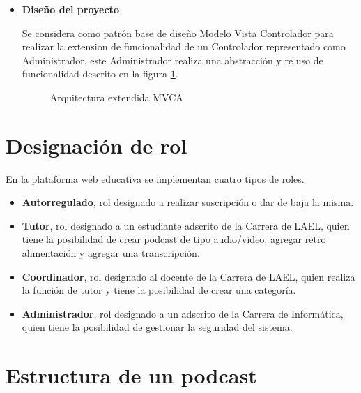 \begin{itemize}

\item \textbf{Diseño del proyecto}

Se considera como patrón base de diseño Modelo Vista Controlador para realizar
la extension de funcionalidad de un Controlador representado como Administrador,
este Administrador realiza una abstracción y re uso de funcionalidad descrito
en la figura \ref{fig:Arquitectura extendida MVCA}.

\begin{figure}[ht]
	\centering
	\caption{Arquitectura extendida MVCA}
	\label{fig:Arquitectura extendida MVCA}
\end{figure}


\end{itemize}

\section{Designación de rol}

En la plataforma web educativa se implementan cuatro tipos de roles.

\begin{itemize}

\item \textbf{Autorregulado}, rol designado a realizar suscripción o dar de
baja la misma.

\item \textbf{Tutor}, rol designado a un estudiante adscrito de la Carrera de
LAEL, quien tiene la posibilidad de crear podcast de tipo audio/vídeo, agregar
retro alimentación y agregar una transcripción. 

\item \textbf{Coordinador}, rol designado al docente de la Carrera de LAEL, quien
realiza la función de tutor y tiene la posibilidad de crear una categoría.

\item \textbf{Administrador}, rol designado a un adscrito de la Carrera de
Informática, quien tiene la posibilidad de gestionar la seguridad del sistema.

\end{itemize}

\section{Estructura de un podcast} \label{structPodcast}

